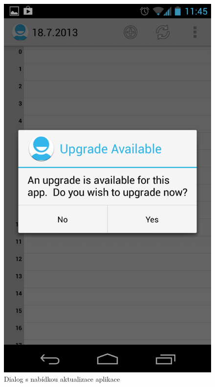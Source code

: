 \documentclass{diplomka}
\begin{document}
\begin{figure}[H]
\begin{minipage}{.45\textwidth}
\centering
  \includegraphics[width=.9\linewidth]{scr/confirm.png}
  \caption{Dialog s nabídkou aktualizace aplikace}
  \label{fig:confirm}
\end{minipage}\hfill%
\begin{minipage}{.45\textwidth}
\centering

\end{minipage}
\end{figure}
\end{document}
